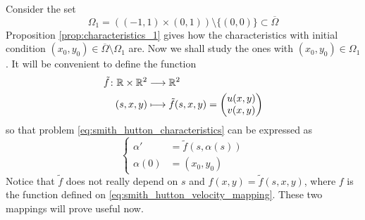Consider the set
\[
	\Omega_1 = ((-1,1) \times (0,1)) \setminus \{ (0,0) \} \subset \overline{\Omega}
\]
Proposition \eqref{prop:characteristics_1} gives how the characteristics with
initial condition $(x_0,y_0) \in \overline{\Omega} \setminus \Omega_1$ are. Now
we shall study the ones with $(x_0,y_0) \in \Omega_1$. It will be convenient to
define the function
\begin{align*}
	\tilde{f} \colon \mathbb{R} \times \mathbb{R}^2 &\longrightarrow \mathbb{R}^2 \\
	(s,x,y) &\longmapsto \tilde{f}(s,x,y) = 
	\begin{pmatrix}
		u(x,y) \\ v(x,y)
	\end{pmatrix}
\end{align*}
so that problem \eqref{eq:smith_hutton_characteristics} can be expressed as
\[
	\left\{
		\begin{aligned}
			\alpha' &= \tilde{f}(s,\alpha(s)) \\
			\alpha(0) &= (x_0,y_0)
		\end{aligned}	
	\right.	
\]
Notice that $\tilde{f}$ does not really depend on $s$ and $f(x,y) =
\tilde{f}(s,x,y)$, where $f$ is the function defined on
\eqref{eq:smith_hutton_velocity_mapping}. These two mappings will prove useful
now. 

